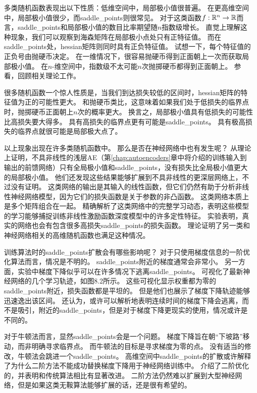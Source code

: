 多类随机函数表现出以下性质：低维空间中，局部极小值很普遍。
在更高维空间中，局部极小值很少，而\gls{saddle_points}则很常见。
对于这类函数$f:\mathbb{R}^n \to \mathbb{R}$而言，\gls{saddle_points}和局部极小值的数目比率期望随$n$指数级增长。
直觉上理解这种现象，我们可以观察到海森矩阵在局部极小点处只有正特征值。
而在\gls{saddle_points}处，\gls{hessian}矩阵则同时具有正负特征值。
试想一下，每个特征值的正负号由抛硬币决定。
在一维情况下，很容易抛硬币得到正面朝上一次而获取局部极小值。
在$n$-维空间中，指数级不太可能$n$次抛掷硬币都得到正面朝上。
参看\cite{Dauphin-et-al-NIPS2014-small}，回顾相关理论工作。


很多随机函数一个惊人性质是，当我们到达损失较低的区间时，\gls{hessian}矩阵的特征值为正的可能性更大。
和抛硬币类比，这意味着如果我们处于低损失的临界点时，抛掷硬币正面朝上$n$次的概率更大。
换言之，局部极小值具有低损失的可能性比高损失要大得多。
具有高损失的临界点更有可能是\gls{saddle_points}。
具有极高损失的临界点就很可能是局部极大点了。

以上现象出现在许多类随机函数中。
那么是否在神经网络中也有发生呢？
\cite{Baldi89}从理论上证明，不具非线性的浅层\gls{AE}（第\ref{chap:autoencoders}章中将介绍的训练输入到输出的前馈网络）只有全局极小值和\gls{saddle_points}，没有损失比全局极小值更大的局部极小值。
他们还发现这些结果能够扩展到不具非线性的更深层网络上，不过没有证明。
这类网络的输出是其输入的线性函数，但它们仍然有助于分析非线性神经网络模型，因为它们的损失函数是关于参数的非凸函数。
这类网络本质上是多个矩阵组合在一起。
\cite{Saxe-et-al-ICLR13}精确解析了这类网络中的完整学习动态，表明这些模型的学习能够捕捉训练非线性激励函数深度模型中的许多定性特征。
\cite{Dauphin-et-al-NIPS2014-small}实验表明，真实的网络也会有包含很多高损失\gls{saddle_points}的损失函数。
\cite{Choromanska-et-al-AISTATS2015}理论证明了另一类和神经网络相关的高维随机函数也满足这种情况。

训练算法时的\gls{saddle_points}扩散会有哪些影响呢？
对于只使用梯度信息的一阶优化算法而言，情况是不明的。
\gls{saddle_points}附近的梯度通常会非常小。
另一方面，实验中梯度下降似乎可以在许多情况下逃离\gls{saddle_points}。
\cite{GoodfellowOptimization15}可视化了最新神经网络的几个学习轨迹，如图8.2所示。
这些可视化显示权重都为零的\gls{saddle_points}附近，损失函数都是平坦的。
但是他们也展示了梯度下降轨迹能够迅速逸出该区间。
\cite{GoodfellowOptimization15}还认为，或许可以解析地表明连续时间的梯度下降会逃离，而不是吸引，附近的\gls{saddle_points}，但是对于梯度下降更现实的使用，情况或许是不同的。

对于牛顿法而言，显然\gls{saddle_points}会是一个问题。
梯度下降旨在朝``下坡路''移动，而非明确寻求临界点。
而牛顿法的目标是寻求梯度为零的点。
没有适当的修改，牛顿法会跳进一个\gls{saddle_points}。
高维空间中\gls{saddle_points}的扩散或许解释了为什么二阶方法不能成功替换梯度下降用于神经网络训练中。
\cite{Dauphin-et-al-NIPS2014-small}介绍了二阶优化的，并表明和传统算法相比有显著改进。
二阶方法仍然难以扩展到大型神经网络，但是如果这类无鞍算法能够扩展的话，还是很有希望的。

